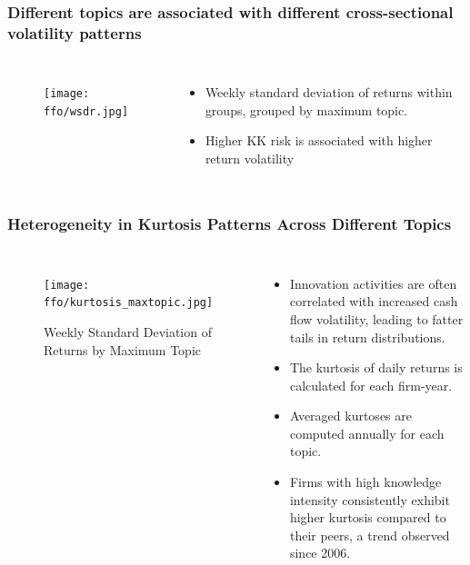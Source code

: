 \documentclass{beamer}
\newcommand{\ffo}{dicfullmc10thr10defnob40noa1_4t}
\begin{document}

\begin{frame}
\frametitle{Different topics are associated with different cross-sectional volatility patterns}
	\begin{columns}
			\begin{figure}[h!]
			\centering
			\texttt{[image: \\ffo/wsdr.jpg]}
			\label{fig:wsdr}
			\end{figure}
		\begin{itemize}
			\scriptsize
			\item Weekly standard deviation of returns within groups, grouped by maximum topic.
			\item Higher KK risk is associated with higher return volatility
		\end{itemize}
	\end{columns}
\end{frame}

\begin{frame}
\frametitle{Heterogeneity in Kurtosis Patterns Across Different Topics}
\scriptsize 
\begin{columns}
\begin{figure}[h!]
\centering
\texttt{[image: \\ffo/kurtosis\_maxtopic.jpg]}
\caption{Weekly Standard Deviation of Returns by Maximum Topic}
\label{fig:kurtosis_maxtopic}
\end{figure}
\scriptsize 
\begin{itemize}
	\item Innovation activities are often correlated with increased cash flow volatility, leading to fatter tails in return distributions.
	\item The kurtosis of daily returns is calculated for each firm-year.
	\item Averaged kurtoses are computed annually for each topic.
	\item Firms with high knowledge intensity consistently exhibit higher kurtosis compared to their peers, a trend observed since 2006.
\end{itemize}
\end{columns}
\end{frame}
\end{document}
